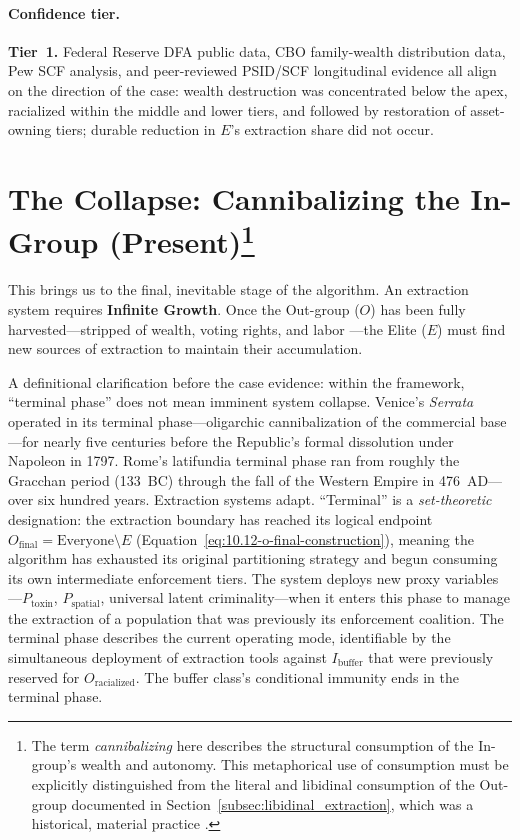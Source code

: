 \paragraph{Confidence tier.}
\textbf{Tier~1.} Federal Reserve DFA public data, CBO family-wealth distribution data, Pew SCF analysis, and peer-reviewed PSID/SCF longitudinal evidence all align on the direction of the case: wealth destruction was concentrated below the apex, racialized within the middle and lower tiers, and followed by restoration of asset-owning tiers; durable reduction in $E$'s extraction share did not occur.

\section{The Collapse: Cannibalizing the In-Group (Present)\protect\footnote{The term \textit{cannibalizing} here describes the structural consumption of the In-group's wealth and autonomy. This metaphorical use of consumption must be explicitly distinguished from the literal and libidinal consumption of the Out-group documented in Section~\ref{subsec:libidinal_extraction}, which was a historical, material practice \cite{woodard_delectable}.}}
This brings us to the final, inevitable stage of the algorithm. An extraction system requires \textbf{Infinite Growth}. Once the Out-group ($O$) has been fully harvested---stripped of wealth, voting rights, and labor \cite{coates}---the Elite ($E$) must find new sources of extraction to maintain their accumulation.

A definitional clarification before the case evidence: within the framework, ``terminal phase'' does not mean imminent system collapse. Venice's \textit{Serrata} operated in its terminal phase---oligarchic cannibalization of the commercial base---for nearly five centuries before the Republic's formal dissolution under Napoleon in 1797. Rome's latifundia terminal phase ran from roughly the Gracchan period (133~BC) through the fall of the Western Empire in 476~AD---over six hundred years. Extraction systems adapt. ``Terminal'' is a \textit{set-theoretic} designation: the extraction boundary has reached its logical endpoint $O_{\text{final}} = \text{Everyone} \setminus E$ (Equation~\ref{eq:10.12-o-final-construction}), meaning the algorithm has exhausted its original partitioning strategy and begun consuming its own intermediate enforcement tiers. The system deploys new proxy variables---$P_{\text{toxin}}$, $P_{\text{spatial}}$, universal latent criminality---when it enters this phase to manage the extraction of a population that was previously its enforcement coalition. The terminal phase describes the current operating mode, identifiable by the simultaneous deployment of extraction tools against $I_{\text{buffer}}$ that were previously reserved for $O_{\text{racialized}}$. The buffer class's conditional immunity ends in the terminal phase.

